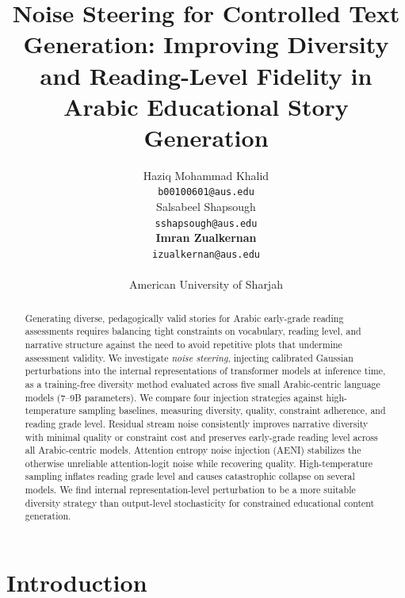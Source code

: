 \documentclass[11pt]{article}
\title{Noise Steering for Controlled Text Generation: Improving Diversity and Reading-Level Fidelity in Arabic Educational Story Generation}
\author{\AND Haziq Mohammad Khalid \\
  \texttt{b00100601@aus.edu} \\\And
  Salsabeel Shapsough \\
  \texttt{sshapsough@aus.edu} \\\And
  {\bf Imran Zualkernan} \\
  \texttt{izualkernan@aus.edu} \\ \AND
  \\ {American University of Sharjah}
  \AND
  }
\begin{document}
\maketitle

\begin{abstract}
    Generating diverse, pedagogically valid stories for Arabic early-grade reading assessments requires balancing tight constraints on vocabulary, reading level, and narrative structure against the need to avoid repetitive plots that undermine assessment validity. We investigate \textit{noise steering}, injecting calibrated Gaussian perturbations into the internal representations of transformer models at inference time, as a training-free diversity method evaluated across five small Arabic-centric language models (7–9B parameters). We compare four injection strategies against high-temperature sampling baselines, measuring diversity, quality, constraint adherence, and reading grade level. Residual stream noise consistently improves narrative diversity with minimal quality or constraint cost and preserves early-grade reading level across all Arabic-centric models. Attention entropy noise injection (AENI) stabilizes the otherwise unreliable attention-logit noise while recovering quality. High-temperature sampling inflates reading grade level and causes catastrophic collapse on several models. We find internal representation-level perturbation to be a more suitable diversity strategy than output-level stochasticity for constrained educational content generation.
\end{abstract}

\section{Introduction}
\end{document}
